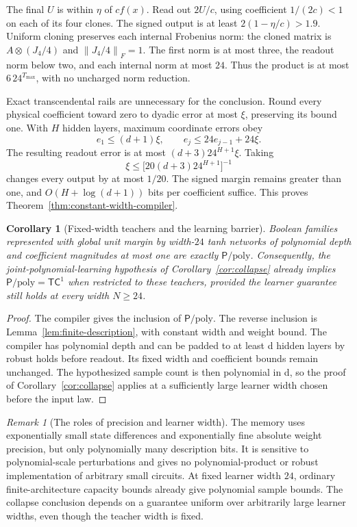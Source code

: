 \documentclass[11pt]{article}
\newtheorem{corollary}[theorem]{Corollary}
\theoremstyle{remark}
\newtheorem{remark}[theorem]{Remark}
\newcommand{\TC}{\mathsf{TC}}
\newcommand{\Ppoly}{\mathsf{P}/\mathrm{poly}}
\newcommand{\norm}[1]{\left\lVert #1\right\rVert}
\begin{document}
The final $U$ is within $\eta$ of $cf(x)$. Read out $2U/c$, using
coefficient $1/(2c)<1$ on each of its four clones. The signed output is
at least $2(1-\eta/c)>1.9$.
Uniform cloning preserves each internal Frobenius norm: the cloned
matrix is $A\otimes(J_4/4)$ and $\norm{J_4/4}_F=1$.
The first norm is at most three, the readout norm below two, and each
internal norm at most $24$. Thus the product is at most
$6\,24^{T_{\max}}$, with no uncharged norm reduction.

Exact transcendental rails are unnecessary for the conclusion.
Round every physical coefficient toward zero to dyadic error at most
$\xi$, preserving its bound one. With $H$ hidden layers, maximum
coordinate errors obey
\[
 e_1\le(d+1)\xi,\qquad e_j\le24e_{j-1}+24\xi.
\]
The resulting readout error is at most
$(d+3)24^{H+1}\xi$. Taking
\[
 \xi\le\bigl[20(d+3)24^{H+1}\bigr]^{-1}
\]
changes every output by at most $1/20$. The signed margin remains
greater than one, and $O(H+\log(d+1))$ bits per coefficient suffice.
This proves Theorem~\ref{thm:constant-width-compiler}.

\begin{corollary}[Fixed-width teachers and the learning barrier]
\label{cor:constant-width-collapse}
Boolean families represented with global unit margin by width-$24$ tanh
networks of polynomial depth and coefficient magnitudes at most one
are exactly $\Ppoly$.
Consequently, the joint-polynomial-learning hypothesis of
Corollary~\ref{cor:collapse} already implies $\Ppoly=\TC^1$
when restricted to these teachers, provided the learner guarantee still
holds at every width $N\ge24$.
\end{corollary}
\begin{proof}
The compiler gives the inclusion of $\Ppoly$. The reverse inclusion
is Lemma~\ref{lem:finite-description}, with constant width and weight
bound. The compiler has polynomial depth and can be padded to at least
d hidden layers by robust holds before readout. Its fixed width and
coefficient bounds remain unchanged. The hypothesized sample count is
then polynomial in d, so the proof of Corollary~\ref{cor:collapse}
applies at a sufficiently large learner width chosen before the input law.
\end{proof}

\begin{remark}[The roles of precision and learner width]
The memory uses exponentially small state differences and exponentially
fine absolute weight precision, but only polynomially many description
bits. It is sensitive to polynomial-scale perturbations and gives no
polynomial-product or robust implementation of arbitrary small circuits.
At fixed learner width $24$, ordinary finite-architecture capacity bounds
already give polynomial sample bounds. The collapse conclusion depends
on a guarantee uniform over arbitrarily large learner widths, even
though the teacher width is fixed.
\end{remark}
\end{document}
